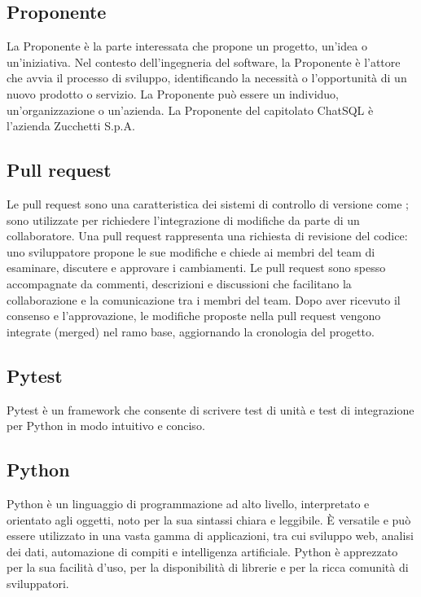 \vspace{2em}
\subsection*{Proponente}
\par La Proponente è la parte interessata che propone un progetto, un'idea o un'iniziativa. Nel contesto dell'ingegneria del software, la Proponente è l'attore che avvia il processo di sviluppo, identificando la necessità o l'opportunità di un nuovo prodotto o servizio. La Proponente può essere un individuo, un'organizzazione o un'azienda. La Proponente del capitolato ChatSQL è l'azienda Zucchetti S.p.A.

\vspace{2em}
\subsection*{Pull request}
\par Le pull request sono una caratteristica dei sistemi di controllo di versione come ; sono utilizzate per richiedere l'integrazione di modifiche da parte di un collaboratore. Una pull request rappresenta una richiesta di revisione del codice: uno sviluppatore propone le sue modifiche e chiede ai membri del team di esaminare, discutere e approvare i cambiamenti. Le pull request sono spesso accompagnate da commenti, descrizioni e discussioni che facilitano la collaborazione e la comunicazione tra i membri del team. Dopo aver ricevuto il consenso e l'approvazione, le modifiche proposte nella pull request vengono integrate (merged) nel ramo base, aggiornando la cronologia del progetto.

\vspace{2em}
\subsection*{Pytest}
\par Pytest è un framework che consente di scrivere test di unità e test di integrazione per Python in modo intuitivo e conciso.

\vspace{2em}
\subsection*{Python}
\par Python è un linguaggio di programmazione ad alto livello, interpretato e orientato agli oggetti, noto per la sua sintassi chiara e leggibile. È versatile e può essere utilizzato in una vasta gamma di applicazioni, tra cui sviluppo web, analisi dei dati, automazione di compiti e intelligenza artificiale. Python è apprezzato per la sua facilità d'uso, per la disponibilità di librerie e per la ricca comunità di sviluppatori.
